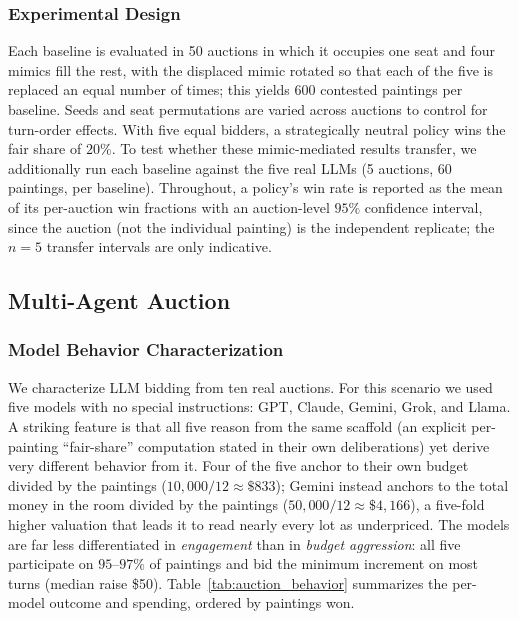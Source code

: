 \subsubsection{Experimental Design}
Each baseline is evaluated in 50 auctions in which it occupies one seat and four mimics fill the rest, with the displaced mimic rotated so that each of the five is replaced an equal number of times; this yields 600 contested paintings per baseline. Seeds and seat permutations are varied across auctions to control for turn-order effects. With five equal bidders, a strategically neutral policy wins the fair share of $20\%$. To test whether these mimic-mediated results transfer, we additionally run each baseline against the five real LLMs (5 auctions, 60 paintings, per baseline). Throughout, a policy's win rate is reported as the mean of its per-auction win fractions with an auction-level $95\%$ confidence interval, since the auction (not the individual painting) is the independent replicate; the $n=5$ transfer intervals are only indicative.



\subsection{Multi-Agent Auction}

\subsubsection{Model Behavior Characterization}
We characterize LLM bidding from ten real auctions. For this scenario we used five models with no special instructions: GPT, Claude, Gemini, Grok, and Llama. A striking feature is that all five reason from the same scaffold (an explicit per-painting ``fair-share'' computation stated in their own deliberations) yet derive very different behavior from it. Four of the five anchor to their own budget divided by the paintings ($10{,}000/12 \approx \$833$); Gemini instead anchors to the total money in the room divided by the paintings ($50{,}000/12 \approx \$4{,}166$), a five-fold higher valuation that leads it to read nearly every lot as underpriced. The models are far less differentiated in \emph{engagement} than in \emph{budget aggression}: all five participate on $95$--$97\%$ of paintings and bid the minimum increment on most turns (median raise \$50). Table~\ref{tab:auction_behavior} summarizes the per-model outcome and spending, ordered by paintings won.

